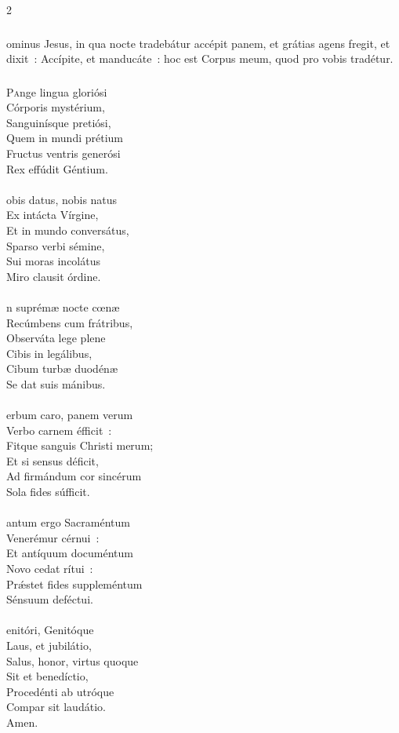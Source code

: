 \documentclass[9pt,twoside]{extarticle}
\begin{document}
\begin{multicols}{2}
\subsubsection*{}
ominus Jesus, in qua nocte tradebátur accépit panem, et grátias agens fregit, et dixit~: Accípite, et manducáte~: hoc est Corpus meum, quod pro vobis tradétur.

\subsubsection*{\center{}}
\lettrine{P}ange lingua gloriósi\\ 
Córporis mystérium,\\ 
Sanguinísque pretiósi,\\ 
Quem in mundi prétium\\ 
Fructus ventris generósi\\ 
Rex effúdit Géntium.\\ 
\\
obis datus, nobis natus\\ 
Ex intácta Vírgine,\\ 
Et in mundo conversátus,\\ 
Sparso verbi sémine,\\ 
Sui moras incolátus\\ 
Miro clausit órdine.\\ 
\\
n suprémæ nocte cœnæ\\ 
Recúmbens cum frátribus,\\ 
Observáta lege plene\\ 
Cibis in legálibus,\\ 
Cibum turbæ duodénæ\\ 
Se dat suis mánibus.\\ 
\\
erbum caro, panem verum\\ 
Verbo carnem éfficit~:\\ 
Fitque sanguis Christi merum;\\ 
Et si sensus déficit,\\ 
Ad firmándum cor sincérum\\ 
Sola fides súfficit.\\ 
\\
antum ergo Sacraméntum\\ 
Venerémur cérnui~:\\ 
Et antíquum documéntum\\ 
Novo cedat rítui~:\\ 
Prǽstet fides suppleméntum\\ 
Sénsuum deféctui.\\ 
\\
enitóri, Genitóque\\ 
Laus, et jubilátio,\\ 
Salus, honor, virtus quoque\\ 
Sit et benedíctio,\\ 
Procedénti ab utróque\\ 
Compar sit laudátio.\\
Amen.


\end{multicols}
\end{document}
